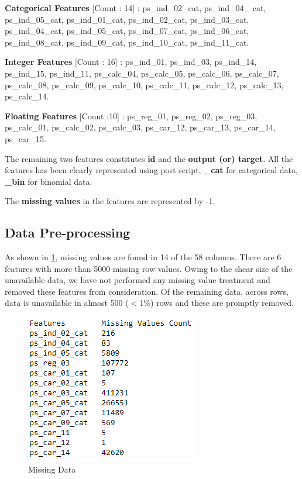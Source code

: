  \textbf{Categorical Features} [Count : 14] : ps\_ind\_02\_cat,  ps\_ind\_04\_ cat, ps\_ind\_05\_cat, ps\_ind\_01\_cat, ps\_ind\_02\_cat,  ps\_ind\_03\_cat, ps\_ind\_04\_cat, ps\_ind\_05\_cat, ps\_ind\_07\_cat,  ps\_ind\_06\_cat, ps\_ind\_08\_cat, ps\_ind\_09\_cat, ps\_ind\_10\_cat,  ps\_ind\_11\_cat.

 \textbf{Integer Features} [Count : 16] : ps\_ind\_01, ps\_ind\_03, ps\_ind\_14, ps\_ind\_15, ps\_ind\_11, ps\_calc\_04, ps\_calc\_05, ps\_calc\_06, ps\_calc\_07, ps\_calc\_08, ps\_calc\_09, ps\_calc\_10, ps\_calc\_11, ps\_calc\_12, ps\_calc\_13, ps\_calc\_14.

 \textbf{Floating Features} [Count :10] : ps\_reg\_01, ps\_reg\_02, ps\_reg\_03, ps\_calc\_01, ps\_calc\_02, ps\_calc\_03, ps\_car\_12, ps\_car\_13, ps\_car\_14, ps\_car\_15.
 
The remaining two features constitutes \textbf{id} and the \textbf{output (or) target}. 
All the features has been clearly represented using post script, \textbf{\_cat} for categorical data, \textbf{\_bin} for binomial data.
 
The \textbf{missing values} in the features are represented by -1.

\subsection{Data Pre-processing}

As shown in \ref{f:missing}, missing values are found in 14 of the 58 columns. There are 6 features with more than 5000 missing row values. Owing to the shear size of the unavailable data, we have not performed any missing value treatment and removed these features from consideration. Of the remaining data, across rows, data is unavailable in almost 500 ($<$1\%) rows and these are promptly removed.

\begin{figure}
  \centering\includegraphics[width=\columnwidth]{images/missingdata}
  \caption{Missing Data}\label{f:missing}
\end{figure}

